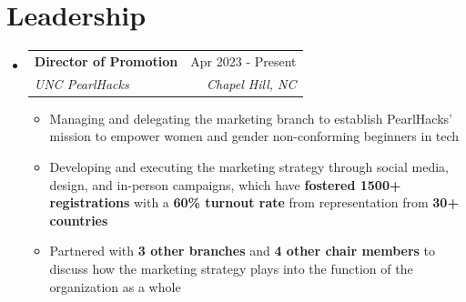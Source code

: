\documentclass[letterpaper,11pt]{article}
\makeatletter
\newcommand{\resumeItem}[1]{
  \item\small{
    {#1 \vspace{-2pt}}
  }
}
\newcommand{\resumeSubheading}[4]{
  \vspace{-2pt}\item
    \begin{tabular*}{0.97\textwidth}[t]{l@{\extracolsep{\fill}}r}
      \textbf{#1} & #2 \\
      \textit{\small#3} & \textit{\small #4} \\
    \end{tabular*}\vspace{-7pt}
}
\newcommand{\resumeSubHeadingListStart}{\begin{itemize}[leftmargin=0.15in, label={}]}
\newcommand{\resumeSubHeadingListEnd}{\end{itemize}}
\newcommand{\resumeItemListStart}{\begin{itemize}}
\newcommand{\resumeItemListEnd}{\end{itemize}\vspace{-5pt}}
\makeatother
\begin{document}
\section{Leadership}
    \resumeSubHeadingListStart
        \resumeSubheading
      {\textbf{Director of Promotion}}{Apr 2023 - Present}
      {UNC PearlHacks}{Chapel Hill, NC}
        \resumeItemListStart
            \resumeItem{Managing and delegating the marketing branch to establish PearlHacks' mission to empower women and gender non-conforming beginners in tech}
            \resumeItem{Developing and executing the marketing strategy through social media, design, and in-person campaigns, which have \textbf{fostered 1500+ registrations} with a \textbf{60\% turnout rate} from representation from \textbf{30+ countries}}
            \resumeItem{Partnered with \textbf{3 other branches} and \textbf{4 other chair members} to discuss how the marketing strategy plays into the function of the organization as a whole}
         \resumeItemListEnd
    \resumeSubHeadingListEnd
\end{document}
